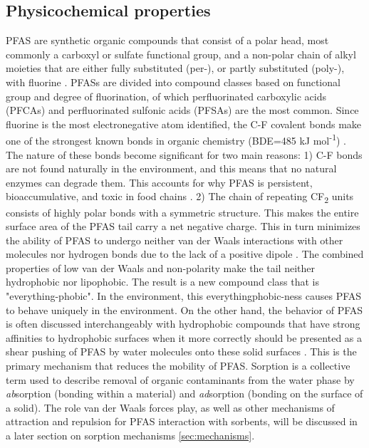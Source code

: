 \subsection{Physicochemical properties}
PFAS are synthetic organic compounds that consist of a polar head, most commonly a carboxyl or sulfate functional group, and a non-polar chain of alkyl moieties that are either fully substituted (per-), or partly substituted (poly-), with fluorine \citep{wang2011physchem}. PFASs are divided into compound classes based on functional group and degree of fluorination, of which perfluorinated carboxylic acids (PFCAs) and perfluorinated sulfonic acids (PFSAs) are the most common. Since fluorine is the most electronegative atom identified, the C-F covalent bonds make one of the strongest known bonds in organic chemistry (BDE=485 kJ mol\textsuperscript{-1}) \citep{Lau2007}. The nature of these bonds become significant for two main reasons: 1) C-F bonds are not found naturally in the environment, and this means that no natural enzymes can degrade them. This accounts for why PFAS is persistent, bioaccumulative, and toxic in food chains \citep{hale2020persistent,krafft2015per}. 2) The chain of repeating CF\textsubscript{2} units consists of highly polar bonds with a symmetric structure. This makes the  entire surface area of the PFAS tail carry a net negative charge. This in turn minimizes the ability of PFAS to undergo neither van der Waals interactions with other molecules nor hydrogen bonds due to the lack of a positive dipole \citep{Arp2006}. The combined properties of low van der Waals and non-polarity make the tail neither hydrophobic nor lipophobic. The result is a new compound class that is "everything-phobic". In the environment, this everythingphobic-ness causes PFAS to behave uniquely in the environment. On the other hand, the behavior of PFAS is often discussed interchangeably with hydrophobic compounds that have strong affinities to hydrophobic surfaces when it more correctly should be presented as a shear pushing of PFAS by water molecules onto these solid surfaces \citep{Arp2006}. This is the primary mechanism that reduces the mobility of PFAS. Sorption is a collective term used to describe removal of organic contaminants from the water phase by \textit{ab}sorption (bonding within a material) and \textit{ad}sorption (bonding on the surface of a solid). The role van der Waals forces play, as well as other mechanisms of attraction and repulsion for PFAS interaction with sorbents, will be discussed in a later section on sorption mechanisms \cref{sec:mechanisms}. 

